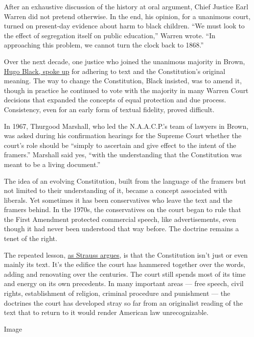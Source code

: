 After an exhaustive discussion of the history at oral argument, Chief
Justice Earl Warren did not pretend otherwise. In the end, his opinion,
for a unanimous court, turned on present-day evidence about harm to
black children. ``We must look to the effect of segregation itself on
public education,'' Warren wrote. ``In approaching this problem, we
cannot turn the clock back to 1868.''

Over the next decade, one justice who joined the unanimous majority in
Brown, \href{https://digitalcommons.law.yale.edu/fss_papers/856/}{Hugo
Black, spoke up} for adhering to text and the Constitution's original
meaning. The way to change the Constitution, Black insisted, was to
amend it, though in practice he continued to vote with the majority in
many Warren Court decisions that expanded the concepts of equal
protection and due process. Consistency, even for an early form of
textual fidelity, proved difficult.

In 1967, Thurgood Marshall, who led the N.A.A.C.P.'s team of lawyers in
Brown, was asked during his confirmation hearings for the Supreme Court
whether the court's role should be ``simply to ascertain and give effect
to the intent of the framers.'' Marshall said yes, ``with the
understanding that the Constitution was meant to be a living document.''

The idea of an evolving Constitution, built from the language of the
framers but not limited to their understanding of it, became a concept
associated with liberals. Yet sometimes it has been conservatives who
leave the text and the framers behind. In the 1970s, the conservatives
on the court began to rule that the First Amendment protected commercial
speech, like advertisements, even though it had never been understood
that way before. The doctrine remains a tenet of the right.

The repeated lesson,
\href{https://harvardlawreview.org/2015/11/does-the-constitution-mean-what-it-says/}{as
Strauss argues}, is that the Constitution isn't just or even mainly its
text. It's the edifice the court has hammered together over the words,
adding and renovating over the centuries. The court still spends most of
its time and energy on its own precedents. In many important areas ---
free speech, civil rights, establishment of religion, criminal procedure
and punishment --- the doctrines the court has developed stray so far
from an originalist reading of the text that to return to it would
render American law unrecognizable.

Image

